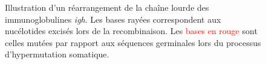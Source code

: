 \begin{figure}[H]
\begin{tikzpicture}[node distance=0cm, thick, font=\tiny]
    \end{tikzpicture}
    \caption{Illustration d'un réarrangement de la chaîne lourde des immunoglobulines \textit{\gls{igh}}.
    Les bases rayées correspondent aux nucélotides excisés lors de la recombinaison. 
    Les \textcolor{red}{bases en rouge} sont celles mutées par rapport aux séquences germinales lors du 
    processus d'hypermutation somatique.}
    \label{fig:igh}
\end{figure}

